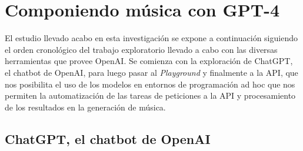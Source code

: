 
\section{Componiendo música con GPT-4}
El estudio llevado acabo en esta investigación se expone a continuación siguiendo el orden cronológico del trabajo exploratorio llevado a cabo con las diversas herramientas que provee OpenAI. Se comienza con la exploración de ChatGPT, el chatbot de OpenAI, para luego pasar al \textit{Playground} y finalmente a la API, que nos posibilita el uso de los modelos en entornos de programación ad hoc que nos permiten la automatización de las tareas de peticiones a la API y procesamiento de los resultados en la generación de música.

\subsection{ChatGPT, el chatbot de OpenAI}